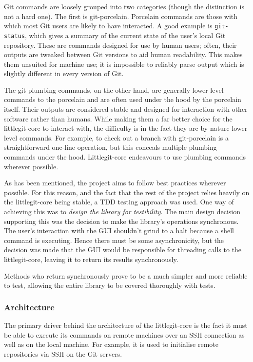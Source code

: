 Git commands are loosely grouped into two categories (though the distinction is not a hard one). The first is git-porcelain. Porcelain commands are those with which most Git users are likely to have interacted. A good example is \texttt{git-status}, which gives a summary of the current state of the user's local Git repository. These are commands designed for use by human users; often, their outputs are tweaked between Git versions to aid human readability. This makes them unsuited for machine use; it is impossible to reliably parse output which is slightly different in every version of Git.

The git-plumbing commands, on the other hand, are generally lower level commands to the porcelain and are often used under the hood by the porcelain itself. Their outputs are considered stable and designed for interaction with other software rather than humans. While making them a far better choice for the littlegit-core to interact with, the difficulty is in the fact they are by nature lower level commands. For example, to check out a branch with git-porcelain is a straightforward one-line operation, but this conceals multiple plumbing commands under the hood. Littlegit-core endeavours to use plumbing commands wherever possible.

As has been mentioned, the project aims to follow best practices wherever possible. For this reason, and the fact that the rest of the project relies heavily on the littlegit-core being stable, a TDD testing approach was used. One way of achieving this was to \emph{design the library for testibility}. The main design decision supporting this was the decision to make the library's operations synchronous. The user's interaction with the GUI shouldn't grind to a halt because a shell command is executing. Hence there must be some asynchronicity, but the decision was made that the GUI would be responsible for threading calls to the littlegit-core, leaving it to return its results synchronously.

Methods who return synchronously prove to be a much simpler and more reliable to test, allowing the entire library to be covered thoroughly with tests.

\subsubsection{Architecture}

The primary driver behind the architecture of the littlegit-core is the fact it must be able to execute its commands on remote machines over an SSH connection as well as on the local machine. For example, it is used to initialise remote repositories via SSH on the Git servers.

